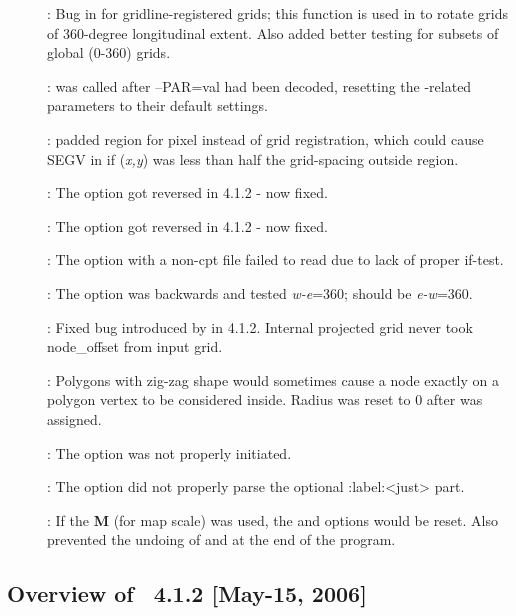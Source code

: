 \begin{description}
\item []: Bug in  for gridline-registered grids; this function is used in
 to rotate grids of 360-degree longitudinal extent. Also added better testing for subsets of global (0-360) grids.
\item []:  was called after --PAR=val had been decoded, resetting
the \PS-related parameters to their default settings.
\item []:  padded region for pixel instead of grid registration,
which could cause SEGV in  if ({\it x,y}) was less than half the grid-spacing outside region.
\item []: The  option got reversed in 4.1.2 - now fixed.
\item []: The  option got reversed in 4.1.2 - now fixed.
\item []: The  option with a non-cpt file failed to read due to lack of proper if-test.
\item []: The  option was backwards and tested {\it w-e}=360; should be {\it e-w}=360.
\item []: Fixed bug introduced by  in 4.1.2. Internal projected
grid never took node_offset from input grid.
\item []: Polygons with zig-zag shape would sometimes cause a node exactly
on a polygon vertex to be considered inside. Radius was reset to 0 after  was assigned.
\item []: The  option was not properly initiated.
\item []: The  option did not properly parse the optional :label:<just> part.
\item []: If the {\bf M} (for map scale) was used, the  and  options would be reset.
Also prevented the undoing of  and  at the end of the program.
\end{description}


\subsection{Overview of \gmt\ 4.1.2 [May-15, 2006]}

